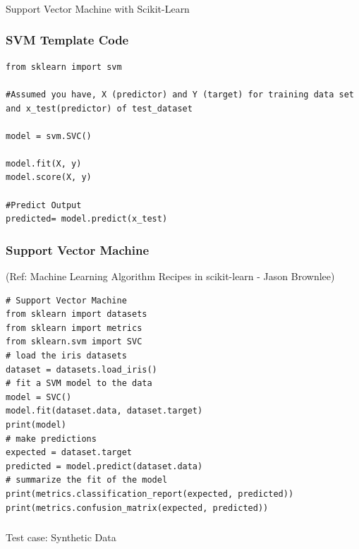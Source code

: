 \begin{frame}[fragile]\frametitle{}
\begin{center}
{\Large Support Vector Machine with Scikit-Learn}
\end{center}
\end{frame}

\begin{frame}[fragile]\frametitle{SVM Template Code}
\begin{lstlisting}
from sklearn import svm 

#Assumed you have, X (predictor) and Y (target) for training data set and x_test(predictor) of test_dataset 

model = svm.SVC()

model.fit(X, y) 
model.score(X, y) 

#Predict Output 
predicted= model.predict(x_test)
\end{lstlisting}
\end{frame}


\begin{frame}[fragile]\frametitle{Support Vector Machine}
{\tiny (Ref: Machine Learning Algorithm Recipes in scikit-learn - Jason Brownlee)}


\begin{lstlisting}
# Support Vector Machine
from sklearn import datasets
from sklearn import metrics
from sklearn.svm import SVC
# load the iris datasets
dataset = datasets.load_iris()
# fit a SVM model to the data
model = SVC()
model.fit(dataset.data, dataset.target)
print(model)
# make predictions
expected = dataset.target
predicted = model.predict(dataset.data)
# summarize the fit of the model
print(metrics.classification_report(expected, predicted))
print(metrics.confusion_matrix(expected, predicted))
\end{lstlisting}


\end{frame}



\begin{frame}[fragile]\frametitle{}
\begin{center}
{\Large Test case: Synthetic Data}
\end{center}
\end{frame}

